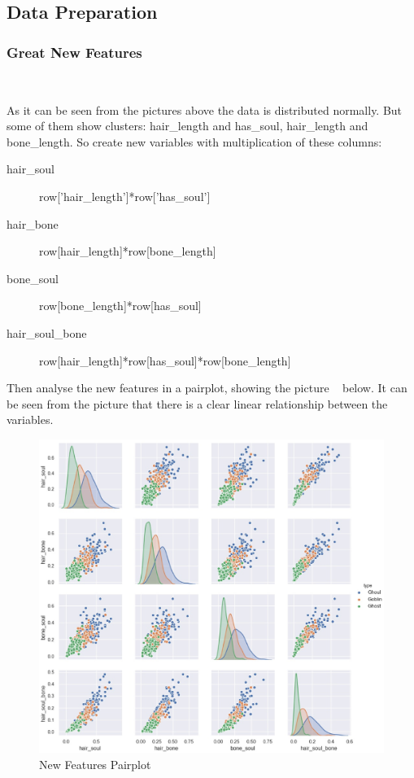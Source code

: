 \subsection{Data Preparation}

\subsubsection{Great New Features}
\

As it can be seen from 
the pictures above 
the data is distributed normally. 
But some of them show clusters: 
hair_length and has_soul, 
hair_length and bone_length. 
So create new variables 
with multiplication of these columns: 

\begin{description}
	\item[hair_soul] row[’hair_length’]*row[’has_soul’] 
	\item[hair_bone]  row[hair_length]*row[bone_length] 
	\item[bone_soul]  row[bone_length]*row[has_soul] 
	\item[hair_soul_bone]  row[hair_length]*row[has_soul]*row[bone_length] 
\end{description}


Then analyse the new features in a pairplot, 
showing the picture ~
below. 
It can be seen from the picture that 
there is a clear linear relationship 
between the variables. 


\begin{figure}[htbp]
	\centering
	\includegraphics[scale=0.3]{figures/hist_1.eps}
	\caption{New Features Pairplot}\label{fig:new_pairplot}
\end{figure}



